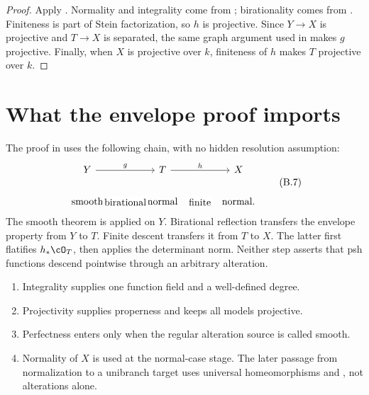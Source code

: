 \begin{proof}
Apply .  Normality and integrality
come from ; birationality comes from
.  Finiteness is part of Stein
factorization, so \(h\) is projective.  Since \(Y\to X\) is projective
and \(T\to X\) is separated, the same graph argument used in
 makes \(g\) projective.  Finally, when \(X\) is
projective over \(k\), finiteness of \(h\) makes \(T\) projective over
\(k\).
\end{proof}

\section{What the envelope proof imports}
\label{sec:appB-envelope-imports}

The proof in 
uses the following chain, with no hidden resolution assumption:
\[
\begin{tikzcd}[column sep=large]
Y \arrow[r,"g"] &
T \arrow[r,"h"] &
X\\
\text{smooth} \arrow[r,phantom,"\text{birational}" description] &
\text{normal} \arrow[r,phantom,"\text{finite}" description] &
\text{normal}.
\end{tikzcd}
\tag{B.7}\label{eq:appB-envelope-chain}
\]
The smooth theorem is applied on \(Y\).  Birational reflection transfers
the envelope property from \(Y\) to \(T\).  Finite descent transfers it
from \(T\) to \(X\).  The latter first flatifies \(h_*\cO_T\), then applies
the determinant norm.  Neither step asserts that psh functions descend
pointwise through an arbitrary alteration.

\begin{remark}
\label{rem:appB-envelope-hypotheses}
\begin{enumerate}
\item Integrality supplies one function field and a well-defined degree.
\item Projectivity supplies properness and keeps all models projective.
\item Perfectness enters only when the regular alteration source is called
      smooth.
\item Normality of \(X\) is used at the normal-case stage.  The later
      passage from normalization to a unibranch target uses universal
      homeomorphisms and , not
      alterations alone.
\end{enumerate}
\end{remark}

